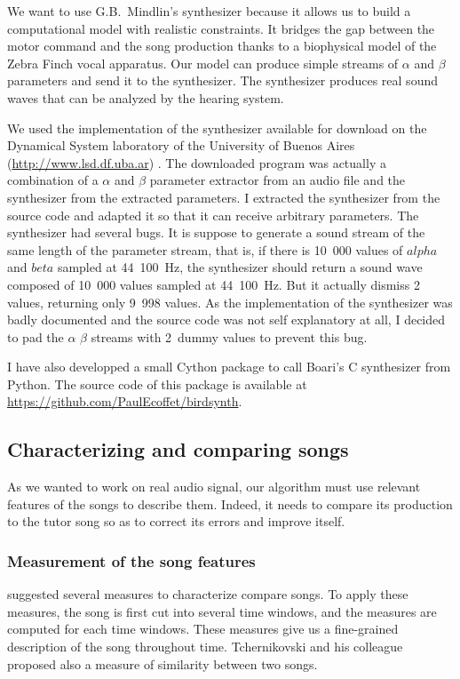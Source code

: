 \documentclass{report}
\begin{document}
We want to use G.B.~Mindlin's synthesizer because it allows us to build a
computational model with realistic constraints. It bridges the gap between the
motor command and the song production thanks to a biophysical model of the Zebra
Finch vocal apparatus. Our model can produce simple streams of \(\alpha\) and
\(\beta\) parameters and send it to the synthesizer. The synthesizer produces
real sound waves that can be analyzed by the hearing system.

We used the implementation of the synthesizer available for download on the
Dynamical System laboratory of the University of Buenos Aires
(\url{http://www.lsd.df.uba.ar}) \parencite{boari_automatic_2015}. The
downloaded program was actually a combination of a \(\alpha\) and \(\beta\)
parameter extractor from an audio file and the synthesizer from the extracted
parameters. I extracted the synthesizer from the source code and adapted it so
that it can receive arbitrary parameters. The synthesizer had several bugs. It
is suppose to generate a sound stream of the same length of the parameter
stream, that is, if there is 10~000 values of \(alpha\) and \(beta\) sampled at
44~100~Hz, the synthesizer should return a sound wave composed of 10~000 values
sampled at 44~100~Hz. But it actually dismiss 2 values, returning only 9~998
values. As the implementation of the synthesizer was badly documented and the
source code was not self explanatory at all, I decided to pad the \(\alpha\)
\(\beta\) streams with 2 dummy values to prevent this bug.

I have also developped a small Cython package to call Boari's C synthesizer from
Python. The source code of this package is available at
\url{https://github.com/PaulEcoffet/birdsynth}.

\subsection{Characterizing and comparing songs}

As we wanted to work on real audio signal, our algorithm must use relevant
features of the songs to describe them. Indeed, it needs to compare its
production to the tutor song so as to correct its errors and improve itself.

\subsubsection{Measurement of the song features}
\label{measures}
\textcite{tchernichovski_procedure_2000} suggested several measures to
characterize compare songs. To apply these measures, the song is first cut into
several time windows, and the measures are computed for each time windows. These
measures give us a fine-grained description of the song throughout time.
Tchernikovski and his colleague proposed also a measure of similarity between
two songs.
\end{document}
